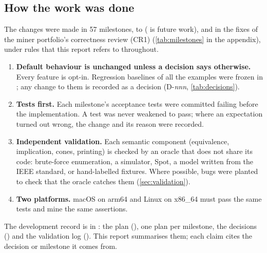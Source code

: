 \subsection{How the work was done}
The changes were made in 57 milestones,  to  ( is future work), and in the fixes of the miner portfolio's correctness review (CR1) (\cref{tab:milestones} in the appendix), under rules that this report refers to throughout.
\begin{enumerate}
\item \textbf{Default behaviour is unchanged unless a decision says otherwise.} Every feature is opt-in. Regression baselines of all the examples were frozen in ; any change to them is recorded as a decision (D-\textit{nnn}, \cref{tab:decisions}).
\item \textbf{Tests first.} Each milestone's acceptance tests were committed failing before the implementation. A test was never weakened to pass; where an expectation turned out wrong, the change and its reason were recorded.
\item \textbf{Independent validation.} Each semantic component (equivalence, implication, cones, printing) is checked by an oracle that does not share its code: brute-force enumeration, a simulator, Spot, a model written from the IEEE standard, or hand-labelled fixtures. Where possible, bugs were planted to check that the oracle catches them (\cref{sec:validation}).
\item \textbf{Two platforms.} macOS on arm64 and Linux on x86\_64 must pass the same tests and mine the same assertions.
\end{enumerate}
The development record is in : the plan (), one plan per milestone, the decisions () and the validation log (). This report summarises them; each claim cites the decision or milestone it comes from.
